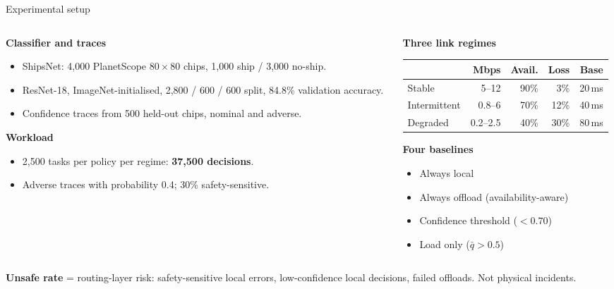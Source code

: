 \documentclass[aspectratio=169, 11pt]{beamer}
\newcommand{\shout}[1]{{\color{navy}\bfseries #1}}
\begin{document}
\begin{frame}{Experimental setup}

\vspace{0.4em}
\begin{columns}[T]
\begin{column}{0.47\textwidth}
  \textbf{\color{navy}Classifier and traces}
  \begin{itemize}\setlength\itemsep{0.15em}\small
    \item ShipsNet: 4,000 PlanetScope $80\times80$ chips, 1,000 ship / 3,000 no-ship.
    \item ResNet-18, ImageNet-initialised, 2,800 / 600 / 600 split, 84.8\% validation accuracy.
    \item Confidence traces from 500 held-out chips, nominal and adverse.
  \end{itemize}
  \vspace{0.7em}
  \textbf{\color{navy}Workload}
  \begin{itemize}\setlength\itemsep{0.15em}\small
    \item 2,500 tasks per policy per regime: \shout{37,500 decisions}.
    \item Adverse traces with probability 0.4; 30\% safety-sensitive.
  \end{itemize}
\end{column}
\begin{column}{0.49\textwidth}
  \textbf{\color{navy}Three link regimes}

  \vspace{0.35em}
  {\footnotesize
  \begin{tabular}{@{}lrrrr@{}}
  \toprule
   & \textbf{Mbps} & \textbf{Avail.} & \textbf{Loss} & \textbf{Base} \\
  \midrule
  Stable       & 5--12    & 90\% & 3\%  & 20\,ms \\
  Intermittent & 0.8--6   & 70\% & 12\% & 40\,ms \\
  Degraded     & 0.2--2.5 & 40\% & 30\% & 80\,ms \\
  \bottomrule
  \end{tabular}}

  \vspace{0.9em}
  \textbf{\color{navy}Four baselines}
  \begin{itemize}\setlength\itemsep{0.2em}\small
    \item Always local
    \item Always offload (availability-aware)
    \item Confidence threshold ($<0.70$)
    \item Load only ($\bar q > 0.5$)
  \end{itemize}
\end{column}
\end{columns}

\vspace{0.3em}
{\color{ink2}\scriptsize \textbf{Unsafe rate} = routing-layer risk: safety-sensitive local errors, low-confidence local decisions, failed offloads. Not physical incidents.}
\end{frame}
\end{document}
